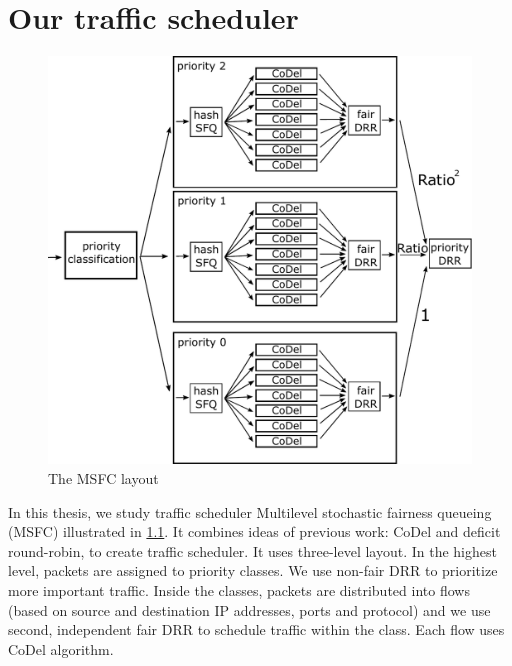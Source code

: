 \chapter{Our traffic scheduler}
\label{chap02}



\begin{figure}
	\centering
	\includegraphics[width=137mm]{drawings/msfc}
	\caption{The MSFC layout}
	\label{fig10:msfc}
\end{figure}

In this thesis, we study traffic scheduler Multilevel stochastic fairness queueing (MSFC) illustrated in \ref{fig10:msfc}. It combines ideas of previous work: CoDel and deficit round-robin, to create traffic scheduler. It uses three-level layout. In the highest level, packets are assigned to priority classes. We use non-fair DRR to prioritize more important traffic. Inside the classes, packets are distributed into flows (based on source and destination IP addresses, ports and protocol) and we use second, independent fair DRR to schedule traffic within the class. Each flow uses CoDel algorithm.

